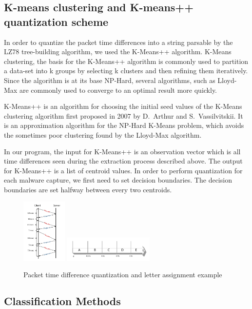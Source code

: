 \documentclass[9pt,journal,compsoc]{IEEEtran}
\begin{document}
\subsection{K-means clustering and K-means++ quantization scheme}
In order to quantize the packet time differences into a string parsable by the LZ78 tree-building algorithm, we used the K-Means++ algorithm.
K-Means clustering, the basis for the K-Means++ algorithm is commonly used to partition a data-set into k groups by selecting k clusters and then refining them iteratively. Since the algorithm is at its base NP-Hard, several algorithms, such as Lloyd-Max are commonly used to converge to an optimal result more quickly.

K-Means++ \cite{Art07} is an algorithm for choosing the initial seed values of the K-Means clustering algorithm first proposed in 2007 by D.~Arthur and S.~Vassilvitskii. It is an approximation algorithm for the NP-Hard K-Means problem, which avoids the sometimes poor clustering found by the Lloyd-Max algorithm.

In our program, the input for K-Means++ is an observation vector which is all time differences seen during the extraction process described above.
The output for K-Means++ is a list of centroid values.
In order to perform quantization for each malware capture, we first need to set decision boundaries. The decision boundaries are set halfway between every two centroids.
\begin{figure}[!h]
 \centering
 \includegraphics[width=0.2\textwidth]{fig2.pdf}
 \includegraphics[width=0.4\textwidth]{fig3.pdf}
 \caption{Packet time difference quantization and letter assignment example\label{fig:packetquant}}
\end{figure} 
\subsection{Classification Methods}
\end{document}
